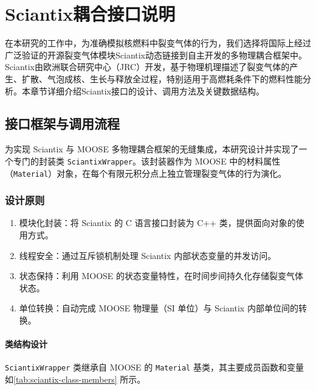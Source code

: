 \chapter{Sciantix耦合接口说明}

在本研究的工作中，为准确模拟核燃料中裂变气体的行为，我们选择将国际上经过广泛验证的开源裂变气体模块Sciantix动态链接到自主开发的多物理耦合框架中。Sciantix由欧洲联合研究中心（JRC）开发，基于物理机理描述了裂变气体的产生、扩散、气泡成核、生长与释放全过程，特别适用于高燃耗条件下的燃料性能分析。本章节详细介绍Sciantix接口的设计、调用方法及关键数据结构。

\section{接口框架与调用流程}
为实现 Sciantix 与 MOOSE 多物理耦合框架的无缝集成，本研究设计并实现了一个专门的封装类 \texttt{SciantixWrapper}。该封装器作为 MOOSE 中的材料属性（\texttt{Material}）对象，在每个有限元积分点上独立管理裂变气体的行为演化。
\subsection{设计原则}
\begin{enumerate}
	\item 模块化封装：将 Sciantix 的 C 语言接口封装为 C++ 类，提供面向对象的使用方式。
	\item 线程安全：通过互斥锁机制处理 Sciantix 内部状态变量的并发访问。
	\item 状态保持：利用 MOOSE 的状态变量特性，在时间步间持久化存储裂变气体状态。
	\item 单位转换：自动完成 MOOSE 物理量（SI 单位）与 Sciantix 内部单位间的转换。
\end{enumerate}
\subsubsection{类结构设计}

\texttt{SciantixWrapper} 类继承自 MOOSE 的 \texttt{Material} 基类，其主要成员函数和变量如\tablename\ref{tab:sciantix-class-members} 所示。

